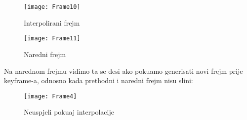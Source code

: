 \begin{figure}[H]
\caption{Interpolirani frejm}
\texttt{[image: Frame10]}
\centering
\end{figure}

\begin{figure}[H]
\caption{Naredni frejm}
\texttt{[image: Frame11]}
\centering
\end{figure}

Na narednom frejmu vidimo \sh ta se desi ako poku\sh amo generisati novi frejm prije keyframe-a, odnosno kada prethodni i naredni frejm nisu sli\ch ni:

\begin{figure}[H]
\caption{Neuspjeli poku\sh aj interpolacije}
\texttt{[image: Frame4]}
\centering
\end{figure}